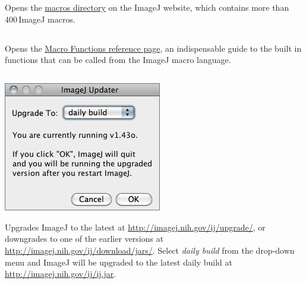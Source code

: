 Opens the \href{http://imagej.nih.gov/ij/macros/}{macros directory}
on the ImageJ website, which contains more than 400\,ImageJ macros. 


\subsection{\protect{}\label{sub:Macro-Functions...}}

Opens the \href{http://imagej.nih.gov/ij/developer/macro/functions.html}{Macro Functions reference page},
an indispensable guide to the built in functions that can be called
from the ImageJ macro language.




\subsection{\protect{}\label{sub:Update-ImageJ...}}

\begin{minipage}[c][1\totalheight][t]{0.375\columnwidth}%
\includegraphics[scale=0.55]{images/Update}%
\end{minipage}%
\begin{minipage}[c][1\totalheight][t]{0.625\columnwidth}%
Upgrades ImageJ to the latest 
at \url{http://imagej.nih.gov/ij/upgrade/}, or downgrades to one
of the earlier versions at \url{http://imagej.nih.gov/ij/download/jars/}.
Select \emph{daily build} from the drop-down menu and ImageJ will
be upgraded to the latest daily build at \url{http://imagej.nih.gov/ij/ij.jar}.


%
\end{minipage}


\subsection{\protect{}\label{sub:Update-Menus}}

